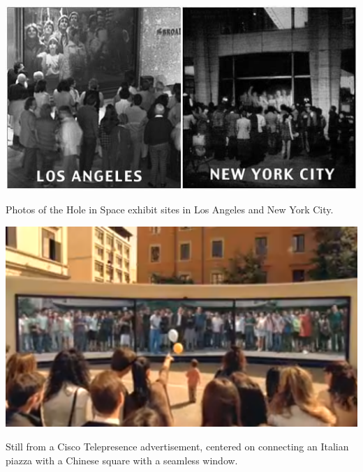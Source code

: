 

\begin{marginfigure}
	\includegraphics{figures/hole_in_space.jpg}
	\caption{Photos of the Hole in Space exhibit sites in Los Angeles and New York City.}
	\label{fig:hole-in-space}
\end{marginfigure}

\begin{marginfigure}
	\includegraphics{figures/cisco-telepresence.png}
	\caption{Still from a Cisco Telepresence advertisement, centered on connecting an Italian piazza with a Chinese square with a seamless window.}
	\label{fig:cisco-telepresence}
\end{marginfigure}



